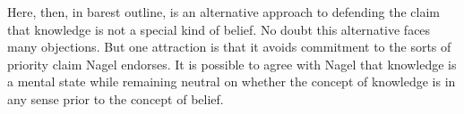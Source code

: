 \documentclass[11pt,a4paper]{extarticle}
\begin{document}
Here, then, in barest outline, is an alternative approach to defending the claim that knowledge is not a special kind of belief.
No doubt this alternative faces many objections.
But one attraction is that it avoids commitment to the sorts of priority claim Nagel endorses.
It is possible to agree with Nagel that knowledge is a mental state while remaining neutral on whether the concept of knowledge is in any sense prior to the concept of belief.






\end{document}
